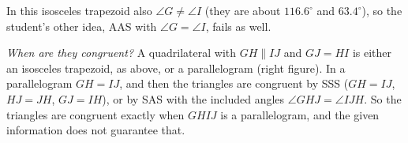 In this isosceles trapezoid also $\angle G\ne\angle I$ (they are about $116.6^\circ$ and $63.4^\circ$), so the student's other idea, AAS with $\angle G=\angle I$, fails as well.

\emph{When are they congruent?} A quadrilateral with $GH\parallel IJ$ and $GJ=HI$ is either an isosceles trapezoid, as above, or a parallelogram (right figure). In a parallelogram $GH=IJ$, and then the triangles are congruent by SSS ($GH=IJ$, $HJ=JH$, $GJ=IH$), or by SAS with the included angles $\angle GHJ=\angle IJH$. So the triangles are congruent exactly when $GHIJ$ is a parallelogram, and the given information does not guarantee that.
